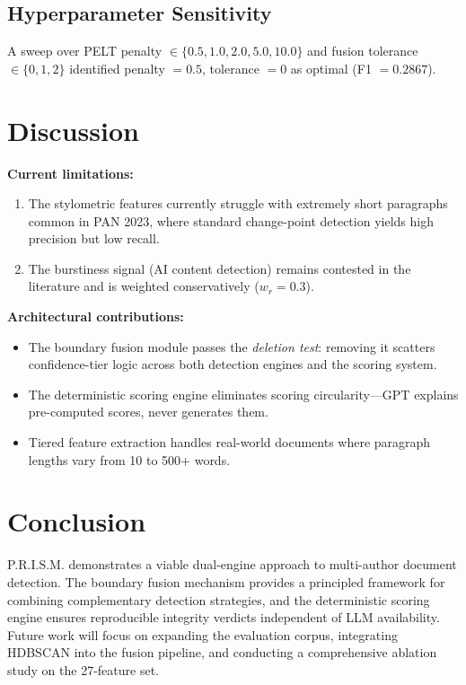 \documentclass[conference]{IEEEtran}
\begin{document}
\subsection{Hyperparameter Sensitivity}
A sweep over PELT penalty $\in \{0.5, 1.0, 2.0, 5.0, 10.0\}$ and fusion tolerance $\in \{0, 1, 2\}$ identified penalty $= 0.5$, tolerance $= 0$ as optimal (F1 $= 0.2867$).

\section{Discussion}
\label{sec:discussion}

\textbf{Current limitations:}
\begin{enumerate}
    \item The stylometric features currently struggle with extremely short paragraphs common in PAN 2023, where standard change-point detection yields high precision but low recall.
    \item The burstiness signal (AI content detection) remains contested in the literature and is weighted conservatively ($w_r = 0.3$).
\end{enumerate}

\textbf{Architectural contributions:}
\begin{itemize}
    \item The boundary fusion module passes the \textit{deletion test}: removing it scatters confidence-tier logic across both detection engines and the scoring system.
    \item The deterministic scoring engine eliminates scoring circularity---GPT explains pre-computed scores, never generates them.
    \item Tiered feature extraction handles real-world documents where paragraph lengths vary from 10 to 500+ words.
\end{itemize}

\section{Conclusion}
\label{sec:conclusion}

P.R.I.S.M. demonstrates a viable dual-engine approach to multi-author document detection. The boundary fusion mechanism provides a principled framework for combining complementary detection strategies, and the deterministic scoring engine ensures reproducible integrity verdicts independent of LLM availability. Future work will focus on expanding the evaluation corpus, integrating HDBSCAN into the fusion pipeline, and conducting a comprehensive ablation study on the 27-feature set.
\end{document}
